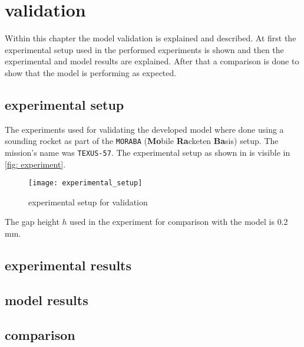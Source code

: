 \documentclass[../thesis.tex]{subfiles}
\begin{document}
\chapter{validation}
\label{chp:validation}

Within this chapter the model validation is explained and described. At first the experimental setup used in the performed experiments is shown and then the experimental and model results are explained. After that a comparison is done to show that the model is performing as expected.

\section{experimental setup}

The experiments used for validating the developed model where done using a sounding rocket as part of the \texttt{MORABA} (\textbf{Mo}bile \textbf{Ra}cketen \textbf{Ba}sis) \cite{stamminger2012moraba} setup. The mission's name was \texttt{TEXUS-57}. The experimental setup as shown in \cite{stergiou2022effects} is visible in \autoref{fig: experiment}.
\begin{figure}[htbp]
	\centering
	\texttt{[image: experimental\_setup]}
	\caption{experimental setup for validation}
	\label{fig: experiment}
\end{figure}
The gap height $h$ used in the experiment for comparison with the model is 0.2 mm. 

\section{experimental results}

\section{model results}
\label{sec: model res}

\section{comparison}
\end{document}
